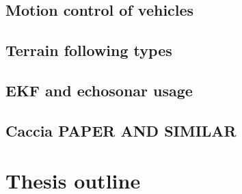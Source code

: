 \subsection{Motion control of vehicles}
\subsection{Terrain following types} 
\subsection{EKF and echosonar usage}
\subsection{Caccia PAPER AND SIMILAR}

\section{Thesis outline}
